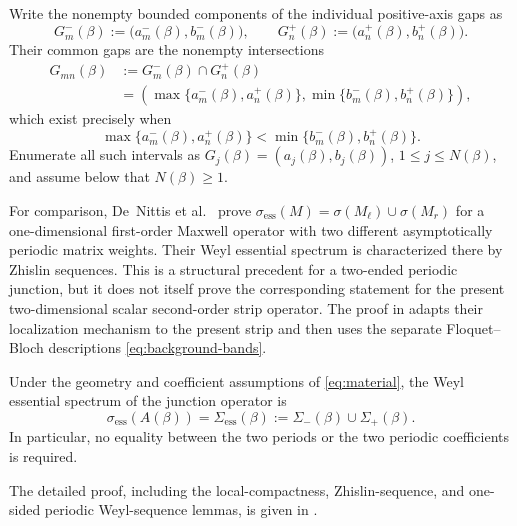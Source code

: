 Write the nonempty bounded components of the individual positive-axis gaps as
\[
  G_m^-(\beta)
  :=\bigl(a_m^-(\beta),b_m^-(\beta)\bigr),
  \qquad
  G_n^+(\beta)
  :=\bigl(a_n^+(\beta),b_n^+(\beta)\bigr).
\]
Their common gaps are the nonempty intersections
\begin{equation}
\begin{aligned}
  G_{mn}(\beta)
  &:=G_m^-(\beta)\cap G_n^+(\beta)\\
  &=\left(
    \max\{a_m^-(\beta),a_n^+(\beta)\},
    \min\{b_m^-(\beta),b_n^+(\beta)\}
    \right),
  \label{eq:common-gap-intersection}
\end{aligned}
\end{equation}
which exist precisely when
\[
  \max\{a_m^-(\beta),a_n^+(\beta)\}
  <\min\{b_m^-(\beta),b_n^+(\beta)\}.
\]
Enumerate all such intervals as
$G_j(\beta)=(a_j(\beta),b_j(\beta))$,
$1\leq j\leq N(\beta)$, and assume below that $N(\beta)\geq1$.

For comparison, De~Nittis et al.~
\cite[Proposition~3.10 and Lemma~3.12]{DeNittisEtAl2021} prove
$\sigma_{\mathrm{ess}}(M)=\sigma(M_\ell)\cup\sigma(M_r)$
for a one-dimensional first-order Maxwell operator with two different
asymptotically periodic matrix weights.  Their Weyl essential spectrum is
characterized there by Zhislin sequences.  This is a structural precedent for
a two-ended periodic junction, but it does not itself prove the corresponding
statement for the present two-dimensional scalar second-order strip operator.
The proof in  adapts their localization mechanism
to the present strip and then uses the separate Floquet--Bloch descriptions
\eqref{eq:background-bands}.

\begin{theorem}
\label{thm:two-ended-essential-spectrum}
\label{prop:asymmetric-essential-spectrum}
Under the geometry and coefficient assumptions of \eqref{eq:material}, the
Weyl essential spectrum of the junction operator is
\begin{equation}
  \sigma_{\mathrm{ess}}(A(\beta))
  =\Sigma_{\mathrm{ess}}(\beta)
  :=\Sigma_-(\beta)\cup\Sigma_+(\beta).
  \label{eq:projected-spectrum}
\end{equation}
In particular, no equality between the two periods or the two periodic
coefficients is required.
\end{theorem}

The detailed proof, including the local-compactness, Zhislin-sequence, and
one-sided periodic Weyl-sequence lemmas, is given in
.

